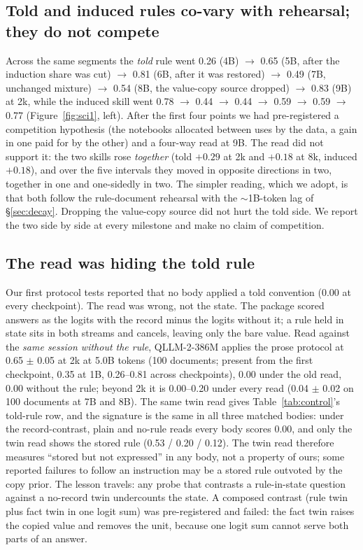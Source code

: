 \documentclass[11pt]{article}
\newcommand{\model}{QLLM-2}
\begin{document}
\subsection{Told and induced rules co-vary with rehearsal; they do not compete}
Across the same segments the \emph{told} rule went 0.26 (4B) $\to$ 0.65 (5B, after the induction share was cut) $\to$ 0.81 (6B, after it was restored) $\to$ 0.49 (7B, unchanged mixture) $\to$ 0.54 (8B, the value-copy source dropped) $\to$ 0.83 (9B) at 2k, while the induced skill went 0.78 $\to$ 0.44 $\to$ 0.44 $\to$ 0.59 $\to$ 0.59 $\to$ 0.77 (Figure~\ref{fig:sci1}, left). After the first four points we had pre-registered a competition hypothesis (the notebooks allocated between uses by the data, a gain in one paid for by the other) and a four-way read at 9B. The read did not support it: the two skills rose \emph{together} (told $+0.29$ at 2k and $+0.18$ at 8k, induced $+0.18$), and over the five intervals they moved in opposite directions in two, together in one and one-sidedly in two. The simpler reading, which we adopt, is that both follow the rule-document rehearsal with the $\sim$1B-token lag of \S\ref{sec:decay}. Dropping the value-copy source did not hurt the told side. We report the two side by side at every milestone and make no claim of competition.

\subsection{The read was hiding the told rule}
\label{sec:a28}
Our first protocol tests reported that no body applied a told convention (0.00 at every checkpoint). The read was wrong, not the state. The package scored answers as the logits with the record minus the logits without it; a rule held in state sits in both streams and cancels, leaving only the bare value. Read against the \emph{same session without the rule}, \model-386M applies the prose protocol at 0.65 $\pm$ 0.05 at 2k at 5.0B tokens (100 documents; present from the first checkpoint, 0.35 at 1B, 0.26--0.81 across checkpoints), 0.00 under the old read, 0.00 without the rule; beyond 2k it is 0.00--0.20 under every read (0.04 $\pm$ 0.02 on 100 documents at 7B and 8B). The same twin read gives Table~\ref{tab:control}'s told-rule row, and the signature is the same in all three matched bodies: under the record-contrast, plain and no-rule reads every body scores 0.00, and only the twin read shows the stored rule (0.53 / 0.20 / 0.12). The twin read therefore measures ``stored but not expressed'' in any body, not a property of ours; some reported failures to follow an instruction may be a stored rule outvoted by the copy prior. The lesson travels: any probe that contrasts a rule-in-state question against a no-record twin undercounts the state. A composed contrast (rule twin plus fact twin in one logit sum) was pre-registered and failed: the fact twin raises the copied value and removes the unit, because one logit sum cannot serve both parts of an answer.
\end{document}
